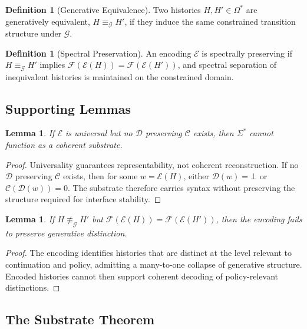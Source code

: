 \documentclass[12pt, a4paper]{article}
\theoremstyle{plain}
\newtheorem{lemma}[theorem]{Lemma}
\theoremstyle{definition}
\newtheorem{definition}[theorem]{Definition}
\theoremstyle{remark}
\begin{document}
\begin{definition}[Generative Equivalence]
Two histories $H, H' \in \Omega^*$ are generatively equivalent, $H \equiv_{\mathcal{G}} H'$, if they induce the same constrained transition structure under $\mathcal{G}$.
\end{definition}

\begin{definition}[Spectral Preservation]
An encoding $\mathcal{E}$ is spectrally preserving if $H \equiv_{\mathcal{G}} H'$ implies $\mathcal{F}(\mathcal{E}(H)) = \mathcal{F}(\mathcal{E}(H'))$, and spectral separation of inequivalent histories is maintained on the constrained domain.
\end{definition}

\subsection{Supporting Lemmas}

\begin{lemma}
\label{lem:universality}
If $\mathcal{E}$ is universal but no $\mathcal{D}$ preserving $\mathcal{C}$ exists, then $\Sigma^*$ cannot function as a coherent substrate.
\end{lemma}

\begin{proof}
Universality guarantees representability, not coherent reconstruction. If no $\mathcal{D}$ preserving $\mathcal{C}$ exists, then for some $w = \mathcal{E}(H)$, either $\mathcal{D}(w) = \bot$ or $\mathcal{C}(\mathcal{D}(w)) = 0$. The substrate therefore carries syntax without preserving the structure required for interface stability.
\end{proof}

\begin{lemma}
\label{lem:spectral}
If $H \not\equiv_{\mathcal{G}} H'$ but $\mathcal{F}(\mathcal{E}(H)) = \mathcal{F}(\mathcal{E}(H'))$, then the encoding fails to preserve generative distinction.
\end{lemma}

\begin{proof}
The encoding identifies histories that are distinct at the level relevant to continuation and policy, admitting a many-to-one collapse of generative structure. Encoded histories cannot then support coherent decoding of policy-relevant distinctions.
\end{proof}

\subsection{The Substrate Theorem}
\end{document}
